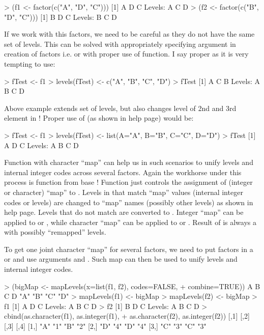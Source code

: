 \documentclass[a4paper]{report}
\begin{document}
\begin{article}
\begin{smallverbatim}
> (f1 <- factor(c("A", "D", "C")))
[1] A D C
Levels: A C D
> (f2 <- factor(c("B", "D", "C")))
[1] B D C
Levels: B C D
\end{smallverbatim}

If we work with this factors, we need to be careful as they do not have the
same set of levels. This can be solved with appropriately specifying
 argument in creation of factors i.e.  or with proper use of  function. I say proper
as it is very tempting to use:

\begin{smallverbatim}
> fTest <- f1
> levels(fTest) <- c("A", "B", "C", "D")
> fTest
[1] A C B
Levels: A B C D
\end{smallverbatim}

Above example extends set of levels, but also changes level of 2nd and 3rd
element in ! Proper use of  (as shown in
 help page) would be:

\begin{smallverbatim}
> fTest <- f1
> levels(fTest) <- list(A="A", B="B", C="C", D="D")
> fTest
[1] A D C
Levels: A B C D
\end{smallverbatim}

Function  with character ``map'' can help us in such
scenarios to unify levels and internal integer codes across several
factors. Again the workhorse under this process is  function
from base \R{}! Function  just controls the assignment of
(integer or character) ``map'' to . Levels in  that match
``map'' values (internal integer codes or levels) are changed to ``map''
names (possibly other levels) as shown in  help page. Levels
that do not match are converted to . Integer ``map'' can be
applied to  or , while character ``map'' can be
applied to  or . Result of 
is always a  with possibly ``remapped'' levels.

To get one joint character ``map'' for several factors, we need to
put factors in a  or  and use arguments
 and . Such map can then be used to
unify levels and internal integer codes.

\begin{smallverbatim}
> (bigMap <- mapLevels(x=list(f1, f2), codes=FALSE,
+                      combine=TRUE))
  A   B   C   D
"A" "B" "C" "D"
> mapLevels(f1) <- bigMap
> mapLevels(f2) <- bigMap
> f1
[1] A D C
Levels: A B C D
> f2
[1] B D C
Levels: A B C D
> cbind(as.character(f1), as.integer(f1),
+       as.character(f2), as.integer(f2))
     [,1] [,2] [,3] [,4]
[1,] "A"  "1"  "B"  "2"
[2,] "D"  "4"  "D"  "4"
[3,] "C"  "3"  "C"  "3"
\end{smallverbatim}


\end{article}
\end{document}
